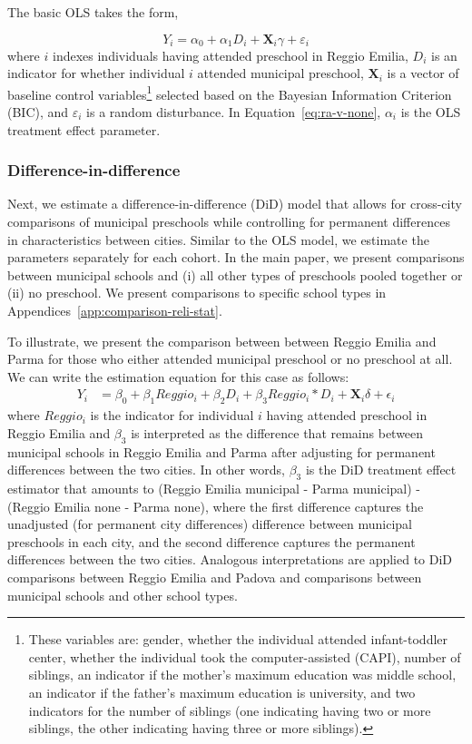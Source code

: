 The basic OLS takes the form, 

\begin{equation}
	Y_i = \alpha_0 + \alpha_1 D_i + \bm{X}_i\gamma + \varepsilon_i
	\label{eq:ra-v-none}
\end{equation}
where $i$ indexes individuals having attended preschool in Reggio Emilia, $D_i$ is an indicator for whether individual $i$ attended municipal preschool, $\bm{X}_i$ is a vector of baseline control variables\footnote{These variables are: gender, whether the individual attended infant-toddler center, whether the individual took the computer-assisted (CAPI), number of siblings, an indicator if the mother's maximum education was middle school, an indicator if the father's maximum education is university, and two indicators for the number of siblings (one indicating having two or more siblings, the other indicating having three or more siblings).} selected based on the Bayesian Information Criterion (BIC), and $\varepsilon_i$ is a random disturbance. In Equation~\ref{eq:ra-v-none}, $\alpha_i$ is the OLS treatment effect parameter.

\subsubsection{Difference-in-difference}  \label{subsubsection:DID}
Next, we estimate a difference-in-difference (DiD) model that allows for cross-city comparisons of municipal preschools while controlling for permanent differences in characteristics between cities. Similar to the OLS model, we estimate the parameters separately for each cohort. In the main paper, we present comparisons between municipal schools and (i) all other types of preschools pooled together or (ii) no preschool. We present comparisons to specific school types in Appendices~\ref{app:comparison-reli-stat}.

To illustrate, we present the comparison between between Reggio Emilia and Parma for those who either attended municipal preschool or no preschool at all. We can write the estimation equation for this case as follows:
\begin{eqnarray}  \label{eq:specific2}
Y_i & = \beta_0 + \beta_1 Reggio_i + \beta_2 D_i + \beta_3 Reggio_i * D_i + \bm{X}_i\delta + \epsilon_i
\end{eqnarray}
\noindent where $Reggio_i$ is the indicator for individual $i$ having attended preschool in Reggio Emilia and $\beta_3$ is interpreted as the difference that remains between municipal schools in Reggio Emilia and Parma after adjusting for permanent differences between the two cities. In other words, $\beta_3$ is the DiD treatment effect estimator that amounts to (Reggio Emilia municipal - Parma municipal) - (Reggio Emilia none - Parma none), where the first difference captures the unadjusted (for permanent city differences) difference between municipal preschools in each city, and the second difference captures the permanent differences between the two cities. Analogous interpretations are applied to DiD comparisons between Reggio Emilia and Padova and comparisons between municipal schools and other school types.


